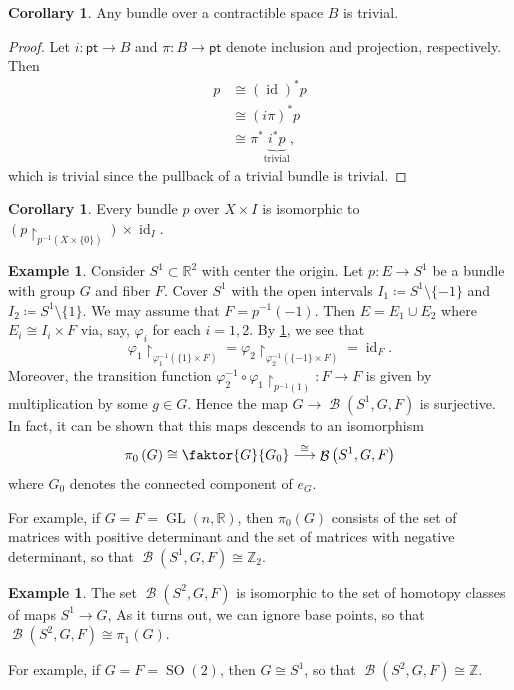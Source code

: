 \documentclass[10pt,letterpaper,cm]{nupset}
\theoremstyle{definition}
\newtheorem{exmp}[defn]{Example}
\theoremstyle{theorem}
\newtheorem{corollary}[defn]{Corollary}
\theoremstyle{remark}
\newcommand{\R}{\mathbb{R}}
\newcommand{\Z}{\mathbb Z}
\newcommand{\1}{\mathbb{1}}
\newcommand{\0}{\vec 0}
\newcommand{\pt}{\mathsf{pt}}
\DeclareMathOperator{\id}{id}
\DeclareMathOperator{\GL}{GL}
\DeclareMathOperator{\SO}{SO}
\DeclareMathOperator{\B}{\mathcal{B}}
\begin{document}
\begin{corollary}
Any bundle over a contractible space $B$ is trivial.
\end{corollary}
\begin{proof}
Let $i : \pt \to B$ and $\pi : B \to \pt$ denote inclusion and projection, respectively. Then 
\begin{align*}
p &  \cong \left(\id\right)^{\ast}{p}
\\ & \cong \left(i{\pi}\right)^{\ast}{p}
\\ & \cong \pi^{\ast}\underbrace{{i^{\ast}}{p}}_{\text{trivial}},
\end{align*}
which is trivial since the pullback of a trivial bundle is trivial.
\end{proof}

\begin{corollary}\label{restiso}
Every bundle $p$ over $X\times I$ is isomorphic to $\left(p\restriction_{p^{-1}\left(X\times \{0\}\right)}\right) \times \id_I$.
\end{corollary}

\begin{exmp}
Consider $S^1 \subset \R^2$ with center the origin. Let $p: E \to S^1$ be a bundle with group $G$ and fiber $F$. Cover $S^1$ with the open intervals $I_1 \coloneqq S^1\setminus \{{-}1\}$ and $I_2 \coloneqq S^1\setminus \{1\}$. We may assume that $F= p^{-1}\left({-}1\right)$. Then $E = E_1 \cup E_2$ where $ E_i \cong I_i \times F$ via, say, $\varphi_i$ for each $i=1,2$. By \cref{restiso}, we see that $$\varphi_1\restriction_{\varphi_1^{-1}\left(\{1\} \times F\right)} = \varphi_2\restriction_{\varphi_2^{-1}\left(\{{-}1\} \times F\right)}= \id_F.$$ Moreover, the transition function $\varphi_2^{-1} \circ \varphi_1\restriction_{p^{-1}\left(1\right)} : F \to F$ is given by multiplication by some $g\in G$. Hence the map $G \to \B\left(S^1, G, F\right)$ is surjective. In fact, it can be shown that this maps descends to an isomorphism
$$\pi_0\left(G\right) \cong \faktor{G}{G_0} \overset{\cong}{\longrightarrow} \B\left(S^1, G, F\right)$$ 
where $G_0$ denotes the connected component of $e_G$. 

\smallskip

For example, if $G=F = \GL\left(n, \R\right)$, then $\pi_0(G)$ consists of the set of matrices with positive determinant and the set of matrices with negative determinant, so that $\B\left(S^1, G, F\right) \cong \Z_2$.
\end{exmp}

\begin{exmp}
The set $\B\left(S^2, G, F \right)$ is isomorphic to the set of homotopy classes of maps $S^1 \to G$, As it turns out, we can ignore base points, so that  $\B\left(S^2, G, F \right) \cong \pi_1\left(G\right)$. 

\smallskip

For example, if $G = F = \SO(2)$, then $G\cong S^1$, so that $\B\left(S^2, G, F \right) \cong \Z$.
\end{exmp}
\end{document}

